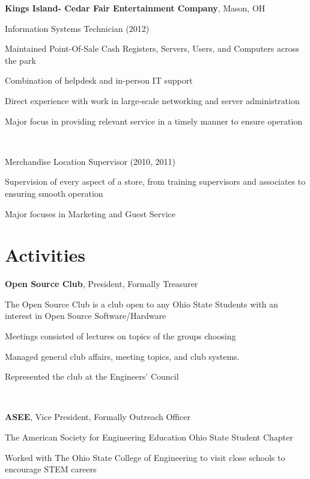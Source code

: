 \documentclass[letterpaper]{resume}
\begin{document}
\textbf{Kings Island- Cedar Fair Entertainment Company}, Mason, OH

Information Systems Technician (2012)
\begin{compactitem}
	\item Maintained Point-Of-Sale Cash Registers, Servers, Users, and Computers across the park

	\item Combination of helpdesk and in-person IT support

	\item Direct experience with work in large-scale networking and server administration

	\item Major focus in providing relevant service in a timely manner to ensure operation
\end{compactitem}

~

Merchandise Location Supervisor (2010, 2011)

\begin{compactitem}
	\item Supervision of every aspect of a store, from training supervisors and associates to ensuring smooth operation

	\item Major focuses in Marketing and Guest Service
\end{compactitem}

\section{Activities}

\textbf{Open Source Club}, President, Formally Treasurer
\begin{compactitem}
	\item The Open Source Club is a club open to any Ohio State Students with an interest in Open Source Software/Hardware
	\item Meetings consisted of lectures on topics of the groups choosing
	\item Managed general club affairs, meeting topics, and club systems.
	\item Represented the club at the Engineers' Council
\end{compactitem}

~

\textbf{ASEE}, Vice President, Formally Outreach Officer
\begin{compactitem}
	\item The American Society for Engineering Education Ohio State Student Chapter
	\item Worked with The Ohio State College of Engineering to visit close schools to encourage STEM careers
\end{compactitem}
\end{document}
